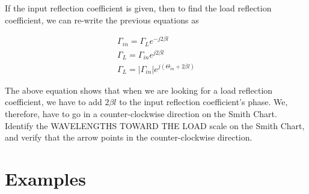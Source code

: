 \documentclass{ximera}
\begin{document}
If the input reflection coefficient is given, then to find the load reflection coefficient, we can re-write the previous equations as


\begin{eqnarray}
\Gamma_{in}=\Gamma_L e^{-j2 \beta l} \\
\Gamma_{L} = \Gamma_{in}  e^{j2 \beta l} \\
\Gamma_{L} = |\Gamma_{in}| e^{j(\Theta_{in} +2 \beta l) } 
\end{eqnarray}

The above equation shows that when we are looking for a load reflection coefficient, we have to add $2 \beta l$ to the input reflection coefficient's phase. We, therefore, have to go in a counter-clockwise direction on the Smith Chart. Identify the WAVELENGTHS TOWARD THE LOAD scale on the Smith Chart, and 
verify that the arrow points in the counter-clockwise direction. 


\section{Examples}
\end{document}
